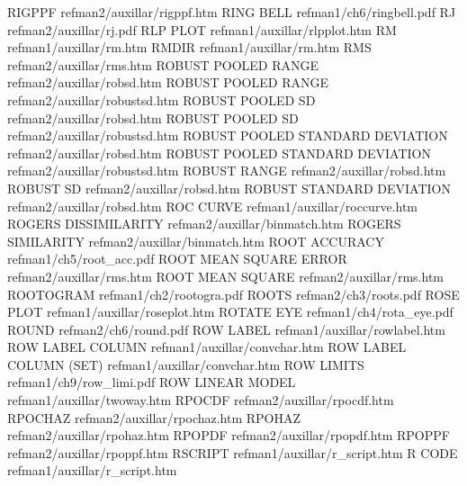 RIGPPF                                  refman2/auxillar/rigppf.htm
RING BELL                               refman1/ch6/ringbell.pdf
RJ                                      refman2/auxillar/rj.pdf
RLP PLOT                                refman1/auxillar/rlpplot.htm
RM                                      refman1/auxillar/rm.htm
RMDIR                                   refman1/auxillar/rm.htm
RMS                                     refman2/auxillar/rms.htm
ROBUST POOLED RANGE                     refman2/auxillar/robsd.htm
ROBUST POOLED RANGE                     refman2/auxillar/robustsd.htm
ROBUST POOLED SD                        refman2/auxillar/robsd.htm
ROBUST POOLED SD                        refman2/auxillar/robustsd.htm
ROBUST POOLED STANDARD DEVIATION        refman2/auxillar/robsd.htm
ROBUST POOLED STANDARD DEVIATION        refman2/auxillar/robustsd.htm
ROBUST RANGE                            refman2/auxillar/robsd.htm
ROBUST SD                               refman2/auxillar/robsd.htm
ROBUST STANDARD DEVIATION               refman2/auxillar/robsd.htm
ROC CURVE                               refman1/auxillar/roccurve.htm
ROGERS DISSIMILARITY                    refman2/auxillar/binmatch.htm
ROGERS SIMILARITY                       refman2/auxillar/binmatch.htm
ROOT ACCURACY                           refman1/ch5/root_acc.pdf
ROOT MEAN SQUARE ERROR                  refman2/auxillar/rms.htm
ROOT MEAN SQUARE                        refman2/auxillar/rms.htm
ROOTOGRAM                               refman1/ch2/rootogra.pdf
ROOTS                                   refman2/ch3/roots.pdf
ROSE PLOT                               refman1/auxillar/roseplot.htm
ROTATE EYE                              refman1/ch4/rota_eye.pdf
ROUND                                   refman2/ch6/round.pdf
ROW LABEL                               refman1/auxillar/rowlabel.htm
ROW LABEL COLUMN                        refman1/auxillar/convchar.htm
ROW LABEL COLUMN (SET)                  refman1/auxillar/convchar.htm
ROW LIMITS                              refman1/ch9/row_limi.pdf
ROW LINEAR MODEL                        refman1/auxillar/twoway.htm
RPOCDF                                  refman2/auxillar/rpocdf.htm
RPOCHAZ                                 refman2/auxillar/rpochaz.htm
RPOHAZ                                  refman2/auxillar/rpohaz.htm
RPOPDF                                  refman2/auxillar/rpopdf.htm
RPOPPF                                  refman2/auxillar/rpoppf.htm
RSCRIPT                                 refman1/auxillar/r_script.htm
R CODE                                  refman1/auxillar/r_script.htm
